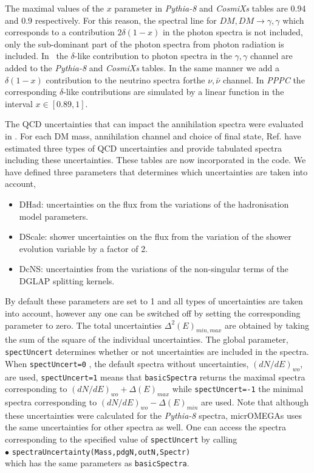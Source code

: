 \documentclass[12pt,a4paper]{article}
\begin{document}
The maximal values of the $x$ parameter  in  { \it Pythia-8} and {\it CosmiXs} tables are  0.94 and 0.9 respectively. For this reason,  the  spectral line 
for  $DM,DM\to \gamma,\gamma$  which corresponds to a contribution  $2 \delta(1-x)$ in the photon spectra is not included, only the sub-dominant part of the photon spectra from photon radiation is included. 
In \micro\, the  $\delta$-like contribution to photon spectra in the 
$ \gamma,\gamma$ channel are added to the { \it Pythia-8} and {\it CosmiXs} tables. In the same manner we add a $\delta(1-x) $ contribution to the neutrino spectra forthe  $\nu,\bar{\nu}$ channel. In {\it PPPC } the   corresponding $\delta$-like contributions are simulated by  a linear function in the  interval 
$x\in[0.89,1]$. 


The QCD uncertainties that can impact the  annihilation spectra  were evaluated in \cite{Jueid:2022qjg}. For each DM mass, annihilation channel and choice of final state, Ref.\cite{Jueid:2022qjg} have estimated three types of QCD uncertainties and provide tabulated spectra including these uncertainties.   These tables are now incorporated in the code. 
We have defined three parameters that determines which  uncertainties are taken into account,\begin{itemize}
   \item{DHad:}  uncertainties on the flux from the variations of the hadronisation model parameters.
   \item{DScale:} shower uncertainties on the flux from the variation of the shower evolution variable by a factor of 2.
   \item{DcNS:}  uncertainties  from the variations of the non-singular terms of the DGLAP splitting kernels. 
\end{itemize}
By default  these parameters are set to 1 and all types of uncertainties are taken into account, however any one can be switched off by setting  the corresponding parameter to zero. The total uncertainties $\Delta^2(E)_{min,max}$ are obtained by taking the sum of the square of the individual uncertainties. 
The global parameter, {\tt  spectUncert} determines whether or not uncertainties are included in the spectra. When  {\tt spectUncert=0} , the default spectra without uncertainties,  $(dN/dE)_{wo}$,  are used,  {\tt spectUncert=1} means that {\tt basicSpectra}  returns the maximal  spectra corresponding to $(dN/dE)_{wo}+\Delta(E)_{max}$  while 
 { \tt spectUncert=-1} the minimal spectra corresponding to $(dN/dE)_{wo}-\Delta(E)_{min}$  are used. 
 Note that although these uncertainties were calculated for the { \it Pythia-8} spectra,  micrOMEGAs uses the same uncertainties for other spectra as well. 
 One can access the spectra corresponding to the specified value of {\tt spectUncert} by calling
\\
$\bullet$ \verb|spectraUncertainty(Mass,pdgN,outN,Spectr)|\\
which has the same parameters as {\tt basicSpectra}. 
\end{document}
